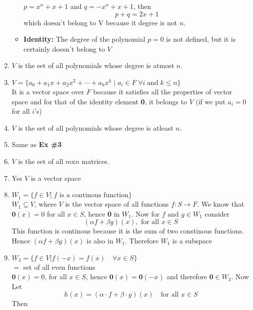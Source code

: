 \documentclass[a4paper, titlepage]{article}
\begin{document}
\begin{enumerate}[label=\textbf{\arabic*.}]
\begin{itemize}
        $p = x^n + x + 1$ and $q = -x^n + x + 1$, then
        $$ p + q = 2x + 1 $$
        which doesn't belong to V because it degree is not $n$.
        \item \textbf{Identity: } The degree of the polynomial $p = 0$
        is not defined, but it is certainly doesn't belong to $V$
    \end{itemize}
    \item $V$ is the set of all polynomials whose degree is atmost $n$.
    \item[]
    $V = \{ a_0 + a_1x + a_2x^2 + \cdots + a_kx^k \; | \; a_i \in F \; \forall i \; \text{and} \; k \le n \} $ \hfill \\ 
    It is a vector space over $F$ because it 
    satisfies all the properties of vector space and for that of the
    identity element \textbf{0}, it belongs to $V$ (if we put $a_i = 0$ for all $i$'s)
    \item $V$ is the set of all polynomials whose degree is atleast $n$.
    \item[] Same as \textbf{Ex \#3} 
    \item $V$ is the set of all $m$x$n$ matrices.
    \item[] Yes $V$ is a vector space
    \begin{center}
        \date{$9^{\text{th}}$ September}
    \end{center}
    \item $W_1 = \{ f \in V \vert \; f \text{ is a continous function} \}$ \hfill \\
    $W_1 \subseteq V$, where $V$ is the vector space of all functions $f: S \rightarrow F$.
    We know that \hfill \\
    $\textbf{0}(x) = 0$ for all $x \in S$, hence \textbf{0} in $W_1$. Now 
    for $f \text{ and } g \in W_1$ consider
    \[ (\alpha f + \beta g)(x), \text{ for all } x \in S \]
    This function is continous because it is the sum of two 
    constinous functions. Hence \( (\alpha f + \beta g)(x) \) is also
    in $W_1$. Therefore $W_1$ is a subspace
    \item $W_3 = \{ f \in V \left. \right\vert f(-x) = f(x) \quad \forall x \in S \} $ \hfill \\
    $ = $ set of all even functions \hfill \\
    $\textbf{0}(x) = 0$, for all $x \in S$, hence 
    $\textbf{0}(x) = \textbf{0}(-x)$ and therefore $\textbf{0} \in W_3$. Now Let
    \[ h(x) = (\alpha\cdot f + \beta\cdot g)(x) \quad \text{for all } x \in S\]
    Then
    \begin{align*}

\end{align*}
\end{enumerate}
\end{document}
